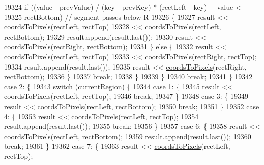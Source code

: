 \begin{DoxyCode}
19324       \textcolor{keywordflow}{if} ((value - prevValue) / (key - prevKey) * (rectLeft - key) + value <
19325           rectBottom) \textcolor{comment}{// segment passes below R}
19326       \{
19327         result << \hyperlink{class_q_c_p_abstract_plottable_ade710a776104b14c1c835168ce1bfc5c}{coordsToPixels}(rectLeft, rectTop)
19328                << \hyperlink{class_q_c_p_abstract_plottable_ade710a776104b14c1c835168ce1bfc5c}{coordsToPixels}(rectLeft, rectBottom);
19329         result.append(result.last());
19330         result << \hyperlink{class_q_c_p_abstract_plottable_ade710a776104b14c1c835168ce1bfc5c}{coordsToPixels}(rectRight, rectBottom);
19331       \} \textcolor{keywordflow}{else} \{
19332         result << \hyperlink{class_q_c_p_abstract_plottable_ade710a776104b14c1c835168ce1bfc5c}{coordsToPixels}(rectLeft, rectTop)
19333                << \hyperlink{class_q_c_p_abstract_plottable_ade710a776104b14c1c835168ce1bfc5c}{coordsToPixels}(rectRight, rectTop);
19334         result.append(result.last());
19335         result << \hyperlink{class_q_c_p_abstract_plottable_ade710a776104b14c1c835168ce1bfc5c}{coordsToPixels}(rectRight, rectBottom);
19336       \}
19337       \textcolor{keywordflow}{break};
19338     \}
19339     \}
19340     \textcolor{keywordflow}{break};
19341   \}
19342   \textcolor{keywordflow}{case} 2: \{
19343     \textcolor{keywordflow}{switch} (currentRegion) \{
19344     \textcolor{keywordflow}{case} 1: \{
19345       result << \hyperlink{class_q_c_p_abstract_plottable_ade710a776104b14c1c835168ce1bfc5c}{coordsToPixels}(rectLeft, rectTop);
19346       \textcolor{keywordflow}{break};
19347     \}
19348     \textcolor{keywordflow}{case} 3: \{
19349       result << \hyperlink{class_q_c_p_abstract_plottable_ade710a776104b14c1c835168ce1bfc5c}{coordsToPixels}(rectLeft, rectBottom);
19350       \textcolor{keywordflow}{break};
19351     \}
19352     \textcolor{keywordflow}{case} 4: \{
19353       result << \hyperlink{class_q_c_p_abstract_plottable_ade710a776104b14c1c835168ce1bfc5c}{coordsToPixels}(rectLeft, rectTop);
19354       result.append(result.last());
19355       \textcolor{keywordflow}{break};
19356     \}
19357     \textcolor{keywordflow}{case} 6: \{
19358       result << \hyperlink{class_q_c_p_abstract_plottable_ade710a776104b14c1c835168ce1bfc5c}{coordsToPixels}(rectLeft, rectBottom);
19359       result.append(result.last());
19360       \textcolor{keywordflow}{break};
19361     \}
19362     \textcolor{keywordflow}{case} 7: \{
19363       result << \hyperlink{class_q_c_p_abstract_plottable_ade710a776104b14c1c835168ce1bfc5c}{coordsToPixels}(rectLeft, rectTop);

\end{DoxyCode}
